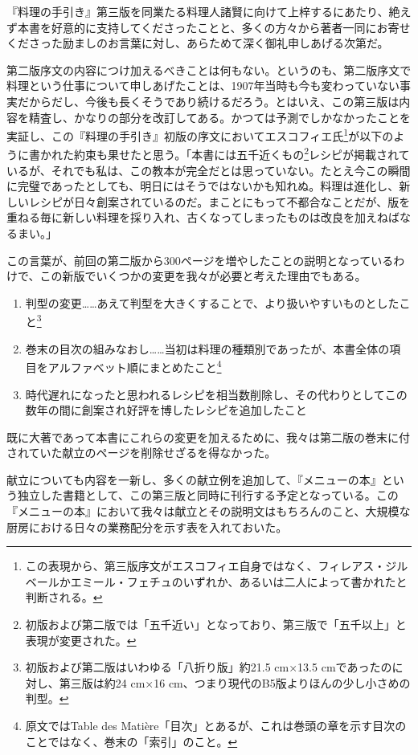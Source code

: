 \begin{Main}
『料理の手引き』第三版を同業たる料理人諸賢に向けて上梓するにあたり、絶えず本書を好意的に支持してくださったことと、多くの方々から著者一同にお寄せくださった励ましのお言葉に対し、あらためて深く御礼申しあげる次第だ。

第二版序文の内容につけ加えるべきことは何もない。というのも、第二版序文で料理という仕事について申しあげたことは、1907年当時も今も変わっていない事実だからだし、今後も長くそうであり続けるだろう。とはいえ、この第三版は内容を精査し、かなりの部分を改訂してある。かつては予測でしかなかったことを実証し、この『料理の手引き』初版の序文においてエスコフィエ氏\footnote{この表現から、第三版序文がエスコフィエ自身ではなく、フィレアス・ジルベールかエミール・フェチュのいずれか、あるいは二人によって書かれたと判断される。}が以下のように書かれた約束も果せたと思う。「本書には五千近くもの\footnote{初版および第二版では「五千近い」となっており、第三版で「五千以上」と表現が変更された。}レシピが掲載されているが、それでも私は、この教本が完全だとは思っていない。たとえ今この瞬間に完璧であったとしても、明日にはそうではないかも知れぬ。料理は進化し、新しいレシピが日々創案されているのだ。まことにもって不都合なことだが、版を重ねる毎に新しい料理を採り入れ、古くなってしまったものは改良を加えねばなるまい。」

この言葉が、前回の第二版から300ページを増やしたことの説明となっているわけで、この新版でいくつかの変更を我々が必要と考えた理由でもある。

\begin{enumerate}
\def\labelenumi{\arabic{enumi}.}
\item
  判型の変更\ldots{}\ldots{}あえて判型を大きくすることで、より扱いやすいものとしたこと\footnote{初版および第二版はいわゆる「八折り版」約21.5
    cm×13.5 cmであったのに対し、第三版は約24 cm×16
    cm、つまり現代のB5版よりほんの少し小さめの判型。}
\item
  巻末の目次の組みなおし\ldots{}\ldots{}当初は料理の種類別であったが、本書全体の項目をアルファベット順にまとめたこと\footnote{原文ではTable
    des
    Matière「目次」とあるが、これは巻頭の章を示す目次のことではなく、巻末の「索引」のこと。}
\item
  時代遅れになったと思われるレシピを相当数削除し、その代わりとしてこの数年の間に創案され好評を博したレシピを追加したこと
\end{enumerate}

既に大著であって本書にこれらの変更を加えるために、我々は第二版の巻末に付されていた献立のページを削除せざるを得なかった。

献立についても内容を一新し、多くの献立例を追加して、『メニューの本』という独立した書籍として、この第三版と同時に刊行する予定となっている。この『メニューの本』において我々は献立とその説明文はもちろんのこと、大規模な厨房における日々の業務配分を示す表を入れておいた。


\end{Main}
